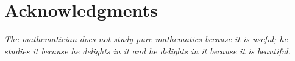 \subsectionend
%
\section*{Acknowledgments}
%

%
\subsectionend
%
\emph{The mathematician does not study pure mathematics because it is useful;
he studies it because he delights in it and he delights in it because it
is beautiful.}
%
